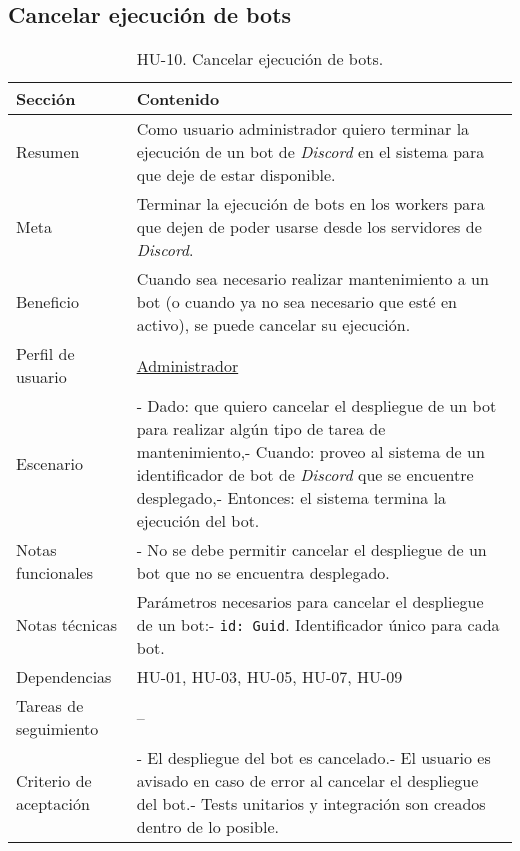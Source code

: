 \subsection{Cancelar ejecución de bots}

\begin{table}[H]
    \centering
    \def\arraystretch{1.25}
    \begin{adjustbox}{max width=\textwidth}
    \begin{tabularx}{\textwidth}{l|L}
    \hline
        \textbf{Sección} & \textbf{Contenido} \\ \hline
    \hline
        Resumen & Como usuario administrador quiero terminar la ejecución de un bot de \textit{Discord} en el sistema para que deje de estar disponible. \\ \hline
        Meta & Terminar la ejecución de bots en los workers para que dejen de poder usarse desde los servidores de \textit{Discord}. \\ \hline
        Beneficio & Cuando sea necesario realizar mantenimiento a un bot (o cuando ya no sea necesario que esté en activo), se puede cancelar su ejecución. \\ \hline
        Perfil de usuario & \hyperref[sec:personaAdmin]{Administrador} \\ \hline
        Escenario & - Dado: que quiero cancelar el despliegue de un bot para realizar algún tipo de tarea de mantenimiento,\linebreak - Cuando: proveo al sistema de un identificador de bot de \textit{Discord} que se encuentre desplegado,\linebreak - Entonces: el sistema termina la ejecución del bot. \\ \hline
        Notas funcionales & - No se debe permitir cancelar el despliegue de un bot que no se encuentra desplegado. \\ \hline
        Notas técnicas & Parámetros necesarios para cancelar el despliegue de un bot:\linebreak - \verb|id: Guid|. Identificador único para cada bot. \\ \hline
        Dependencias & HU-01, HU-03, HU-05, HU-07, HU-09 \\ \hline
        Tareas de seguimiento & – \\ \hline
        Criterio de aceptación & - El despliegue del bot es cancelado.\linebreak - El usuario es avisado en caso de error al cancelar el despliegue del bot.\linebreak - Tests unitarios y integración son creados dentro de lo posible. \\ \hline
    \end{tabularx}
    \end{adjustbox}
    \caption{HU-10. Cancelar ejecución de bots.}
\end{table}


